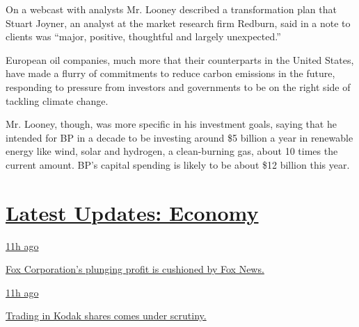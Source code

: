 On a webcast with analysts Mr. Looney described a transformation plan
that Stuart Joyner, an analyst at the market research firm Redburn, said
in a note to clients was ``major, positive, thoughtful and largely
unexpected.''

European oil companies, much more that their counterparts in the United
States, have made a flurry of commitments to reduce carbon emissions in
the future, responding to pressure from investors and governments to be
on the right side of tackling climate change.

Mr. Looney, though, was more specific in his investment goals, saying
that he intended for BP in a decade to be investing around \$5 billion a
year in renewable energy like wind, solar and hydrogen, a clean-burning
gas, about 10 times the current amount. BP's capital spending is likely
to be about \$12 billion this year.

\hypertarget{latest-updates-economy}{%
\section{\texorpdfstring{\href{https://www.nytimes3xbfgragh.onion/live/2020/08/04/business/stock-market-today-coronavirus?action=click\&pgtype=Article\&state=default\&region=MAIN_CONTENT_1\&context=storylines_live_updates}{Latest
Updates:
Economy}}{Latest Updates: Economy}}\label{latest-updates-economy}}

\href{https://www.nytimes3xbfgragh.onion/live/2020/08/04/business/stock-market-today-coronavirus?action=click\&pgtype=Article\&state=default\&region=MAIN_CONTENT_1\&context=storylines_live_updates\#fox-corporations-plunging-profit-is-cushioned-by-fox-news}{11h
ago}

\href{https://www.nytimes3xbfgragh.onion/live/2020/08/04/business/stock-market-today-coronavirus?action=click\&pgtype=Article\&state=default\&region=MAIN_CONTENT_1\&context=storylines_live_updates\#fox-corporations-plunging-profit-is-cushioned-by-fox-news}{Fox
Corporation's plunging profit is cushioned by Fox News.}

\href{https://www.nytimes3xbfgragh.onion/live/2020/08/04/business/stock-market-today-coronavirus?action=click\&pgtype=Article\&state=default\&region=MAIN_CONTENT_1\&context=storylines_live_updates\#trading-in-kodak-shares-comes-under-scrutiny}{11h
ago}

\href{https://www.nytimes3xbfgragh.onion/live/2020/08/04/business/stock-market-today-coronavirus?action=click\&pgtype=Article\&state=default\&region=MAIN_CONTENT_1\&context=storylines_live_updates\#trading-in-kodak-shares-comes-under-scrutiny}{Trading
in Kodak shares comes under scrutiny.}

